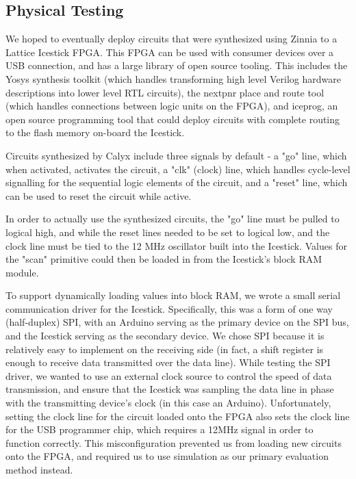 \documentclass[12pt]{article}
\begin{document}
\subsection{Physical Testing}
We hoped to eventually deploy circuits that were synthesized using Zinnia to a Lattice Icestick FPGA.
This FPGA can be used with consumer devices over a USB connection, and has a large library of open source tooling.
This includes the Yosys synthesis toolkit (which handles transforming high level Verilog hardware descriptions into
lower level RTL circuits), the nextpnr place and route tool (which handles connections between logic units
on the FPGA), and iceprog, an open source programming tool that could deploy circuits with complete routing
to the flash memory on-board the Icestick.

Circuits synthesized by Calyx include three signals by default - a "go" line, which when activated,
activates the circuit, a "clk" (clock) line, which handles cycle-level signalling for the sequential logic
elements of the circuit, and a "reset" line, which can be used to reset the circuit while active.

In order to actually use the synthesized circuits, the "go" line must be pulled to logical high, and
while the reset lines needed to be set to logical low, and the clock line must be tied to the 12 MHz
oscillator built into the Icestick. Values for the "scan" primitive could then be loaded in from the Icestick's
block RAM module.

To support dynamically loading values into block RAM, we wrote a small serial communication driver for the Icestick.
Specifically, this was a form of one way (half-duplex) SPI, with an Arduino serving as the primary device on the SPI
bus, and the Icestick serving as the secondary device. We chose SPI because it is relatively easy to implement
on the receiving side (in fact, a shift register is enough to receive data transmitted over the data line).
While testing the SPI driver, we wanted to use an external clock source to control the speed of data transmission,
and ensure that the Icestick was sampling the data line in phase with the transmitting device's clock (in this case
an Arduino). Unfortunately, setting the clock line for the circuit loaded onto the FPGA also sets the clock line
for the USB programmer chip, which requires a 12MHz signal in order to function correctly. This misconfiguration
prevented us from loading new circuits onto the FPGA, and required us to use simulation as our primary evaluation
method instead.
\end{document}
